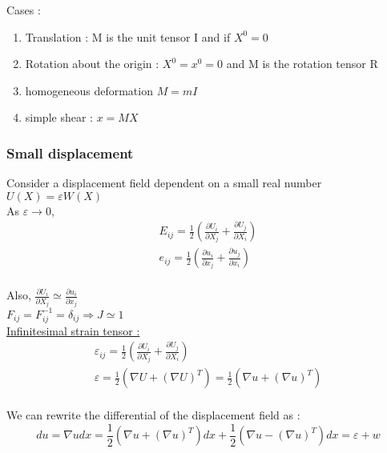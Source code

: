 \documentclass[../main.tex]{subfiles}
\begin{document}
Cases :
\begin{enumerate}
    \item Translation : M is the unit tensor I and if $X^0=0$\\
    \item Rotation about the origin : $X^0 = x^0 =0$ and M is the rotation tensor R\\
    \item homogeneous deformation $M = mI$\\
\item simple shear : $x = MX$\\
\end{enumerate}

\subsubsection{Small displacement}
Consider a displacement field dependent on a small real number $U(X) = \varepsilon W(X)$\\
As $\varepsilon \rightarrow 0$, \begin{equation}\begin{gathered}
    E_{ij} = \frac{1}{2} (\frac{\partial U_i}{\partial X_j} + \frac{\partial U_j}{\partial X_i})\\
    e_{ij} = \frac{1}{2}(\frac{\partial u_i}{\partial x_j} + \frac{\partial u_j}{\partial x_i})\\
    \end{gathered}
\end{equation}

Also, $\frac{\partial U_i}{\partial X_j} \simeq \frac{\partial u_i}{\partial x_j}$\\
$F_{ij} = F_{ij}^{-1} = \delta_{ij} \Rightarrow J \simeq 1$\\

\quad \underline{Infinitesimal strain tensor :}\\
\begin{equation}\begin{gathered}
    \varepsilon_{ij} = \frac{1}{2}(\frac{\partial U_i}{\partial X_j} + \frac{\partial U_j}{\partial X_i})\\
\varepsilon = \frac{1}{2}(\nabla U + (\nabla U)^T) = \frac{1}{2}(\nabla u + (\nabla u)^T)\\
    \end{gathered}
\end{equation}

We can rewrite the differential of the displacement field as : \begin{equation}
    du = \nabla u dx = \frac{1}{2}(\nabla u + (\nabla u)^T)dx + \frac{1}{2}(\nabla u - (\nabla u)^T)dx = \varepsilon + w
\end{equation}
\end{document}
